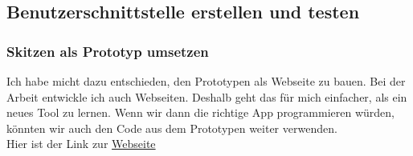 \documentclass[10pt]{article}
\begin{document}
	\subsection{Benutzerschnittstelle erstellen und testen}
	\subsubsection{Skitzen als Prototyp umsetzen}
	Ich habe micht dazu entschieden, den Prototypen als Webseite zu bauen. Bei der Arbeit entwickle ich auch Webseiten. Deshalb geht das für mich einfacher, als ein neues Tool zu lernen. Wenn wir dann die richtige App programmieren würden, könnten wir auch den Code aus dem Prototypen weiter verwenden.\\
	Hier ist der Link zur \href{https://davidhafner.github.io/M322-Documentation/}{Webseite}\\\\
	
\end{document}
